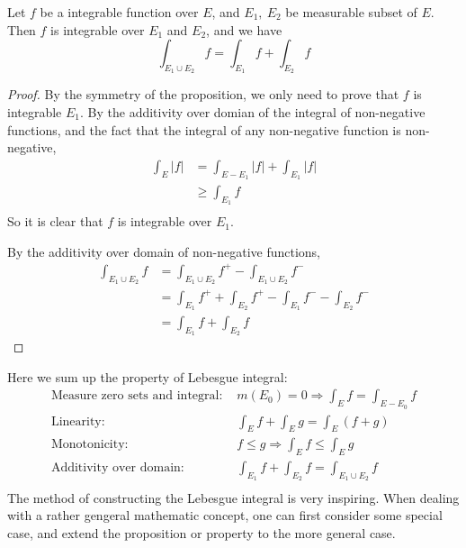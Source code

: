 \documentclass[lang=en, 12pt]{elegantbook}
\begin{document}
        \begin{theorem}
            Let $f$ be a integrable function over $E$, and $E_1, \ E_2$ be measurable subset of $E$. Then $f$ is integrable over $E_1$ and 
        $E_2$, and we have 
        $$\int_{E_1 \cup E_2} f = \int_{E_1} f + \int_{E_2} f$$
        \end{theorem}
        \begin{proof}
            By the symmetry of the proposition, we only need to prove that $f$ is integrable $E_1$. By the additivity over domian of the 
        integral of non-negative functions, and the fact that the integral of any non-negative function is non-negative,
        \begin{equation*}
            \begin{aligned}
                \int_E |f| &= \int_{E-E_1} |f| +\int_{E_1} |f| \\
                &\geq \int_{E_1} f \\
            \end{aligned}
        \end{equation*}
        So it is clear that $f$ is integrable over $E_1$. \par 
            By the additivity over domain of non-negative functions,
        \begin{equation*}
            \begin{aligned}
                \int_{E_1\cup E_2} f &= \int_{E_1\cup E_2} f^+ - \int_{E_1\cup E_2} f^-\\
                &= \int_{E_1} f^+ + \int_{E_2} f^+ - \int_{E_1} f^- - \int_{E_2} f^-\\
                &= \int_{E_1} f + \int_{E_2} f
            \end{aligned}
        \end{equation*}
        \end{proof}
            Here we sum up the property of Lebesgue integral:
            \begin{equation*}
                \begin{aligned}
                    \mbox{Measure zero sets and integral: }& m(E_0) = 0 \Rightarrow \int_E f = \int_{E-E_0} f\\
                    \mbox{Linearity: }& \int_E f + \int_E g = \int_E (f+g)\\
                    \mbox{Monotonicity: }& f \leq g \Rightarrow \int_E f \leq \int_E g\\
                    \mbox{Additivity over domain: }& \int_{E_1} f + \int_{E_2} f = \int_{E_1 \cup E_2} f\\ 
                \end{aligned}
            \end{equation*}
            The method of constructing the Lebesgue integral is very inspiring. When dealing with a rather gengeral mathematic concept,
        one can first consider some special case, and extend the proposition or property to the more general case.  
\end{document}
